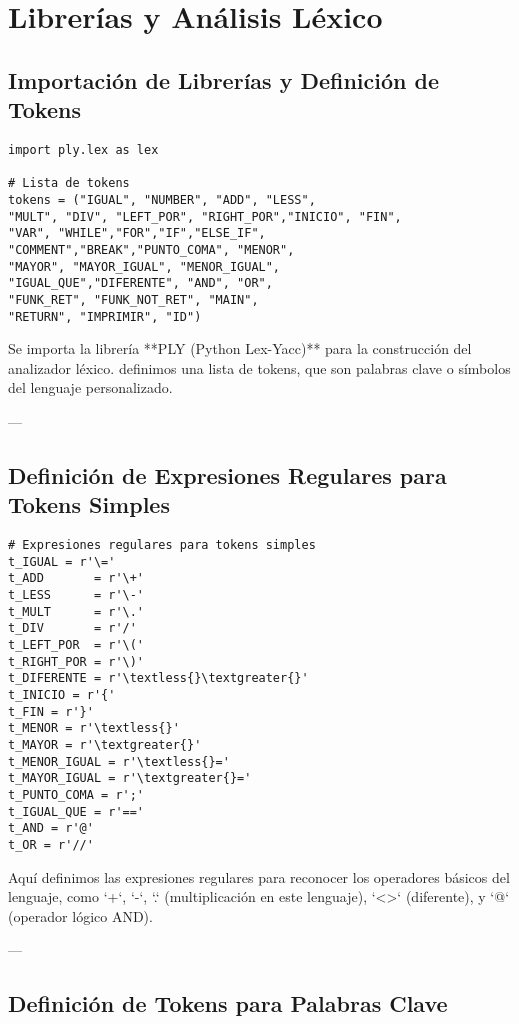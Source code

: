 \documentclass{article}
\begin{document}
\section{Librerías y Análisis Léxico}

\subsection{Importación de Librerías y Definición de Tokens}

\begin{verbatim}
import ply.lex as lex

# Lista de tokens
tokens = ("IGUAL", "NUMBER", "ADD", "LESS", 
"MULT", "DIV", "LEFT_POR", "RIGHT_POR","INICIO", "FIN", 
"VAR", "WHILE","FOR","IF","ELSE_IF", 
"COMMENT","BREAK","PUNTO_COMA", "MENOR",
"MAYOR", "MAYOR_IGUAL", "MENOR_IGUAL",
"IGUAL_QUE","DIFERENTE", "AND", "OR", 
"FUNK_RET", "FUNK_NOT_RET", "MAIN", 
"RETURN", "IMPRIMIR", "ID")
\end{verbatim}

Se importa la librería **PLY (Python Lex-Yacc)** para la construcción del analizador léxico.  definimos  una lista de tokens, que son palabras clave o símbolos del lenguaje personalizado.

---

\subsection{Definición de Expresiones Regulares para Tokens Simples}

\begin{verbatim}
# Expresiones regulares para tokens simples
t_IGUAL = r'\='
t_ADD       = r'\+'
t_LESS      = r'\-'
t_MULT      = r'\.'
t_DIV       = r'/'
t_LEFT_POR  = r'\('
t_RIGHT_POR = r'\)'
t_DIFERENTE = r'\textless{}\textgreater{}'
t_INICIO = r'{'
t_FIN = r'}'
t_MENOR = r'\textless{}'
t_MAYOR = r'\textgreater{}'
t_MENOR_IGUAL = r'\textless{}='
t_MAYOR_IGUAL = r'\textgreater{}='
t_PUNTO_COMA = r';'
t_IGUAL_QUE = r'=='
t_AND = r'@'
t_OR = r'//'
\end{verbatim}

Aquí  definimos las expresiones regulares para reconocer los operadores básicos del lenguaje, como `+`, `-`, `.` (multiplicación en este lenguaje), `\textless{}\textgreater{}` (diferente), y `@` (operador lógico AND).

---

\subsection{Definición de Tokens para Palabras Clave}
\end{document}
